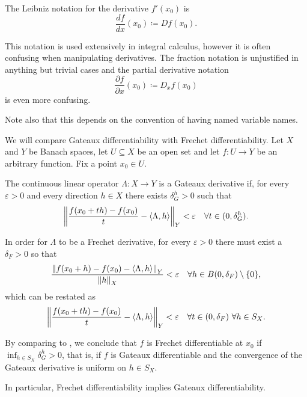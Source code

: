 \begin{remark}
\begin{remenum}
     The Leibniz notation for the derivative \( f'(x_0) \) is
    \begin{equation*}
      \frac {df} {dx} (x_0) \coloneqq D f(x_0).
    \end{equation*}

    This notation is used extensively in integral calculus, however it is often confusing when manipulating derivatives. The fraction notation is unjustified in anything but trivial cases and the partial derivative notation
    \begin{equation*}
      \frac {\partial f} {\partial x} (x_0) \coloneqq D_x f(x_0)
    \end{equation*}
    is even more confusing.

   Note also that this depends on the convention of having named variable names.
  \end{remenum}
\end{remark}

\begin{remark}\label{remark:gateaux_vs_frechet}
  We will compare Gateaux differentiability with Frechet differentiability. Let \( X \) and \( Y \) be Banach spaces, let \( U \subseteq X \) be an open set and let \( f: U \to Y \) be an arbitrary function. Fix a point \( x_0 \in U \).

  The continuous linear operator \( \Lambda: X \to Y \) is a Gateaux derivative if, for every \( \varepsilon > 0 \) and every direction \( h \in X \) there exists \( \delta_G^h > 0 \) such that
  \begin{equation}\label{remark:gateaux_vs_frechet/gateaux}
    \left\Vert \frac {f(x_0 + th) - f(x_0)} t - \left\langle \Lambda, h \right\rangle \right\Vert_Y < \varepsilon \quad\forall t \in (0, \delta_G^h).
  \end{equation}

  In order for \( \Lambda \) to be a Frechet derivative, for every \( \varepsilon > 0 \) there must exist a \( \delta_F > 0 \) so that
  \begin{equation*}
    \frac{\left\Vert f(x_0 + h) - f(x_0) - \left\langle \Lambda, h \right\rangle \right\Vert_Y} {\left\Vert h \right\Vert_X} < \varepsilon \quad\forall h \in B(0, \delta_F) \setminus \{ 0 \},
  \end{equation*}
  which can be restated as
  \begin{equation}\label{remark:gateaux_vs_frechet/frechet}
    \left\Vert \frac {f(x_0 + th) - f(x_0)} t - \left\langle \Lambda, h \right\rangle \right\Vert_Y < \varepsilon \quad\forall t \in (0, \delta_F) \ \forall h \in S_X.
  \end{equation}

  By comparing  to , we conclude that \( f \) is Frechet differentiable at \( x_0 \) if \( \inf_{h \in S_X} \delta^h_G > 0 \), that is, if \( f \) is Gateaux differentiable and the convergence of the Gateaux derivative is uniform on \( h \in S_X \).

  In particular, Frechet differentiability implies Gateaux differentiability.
\end{remark}

